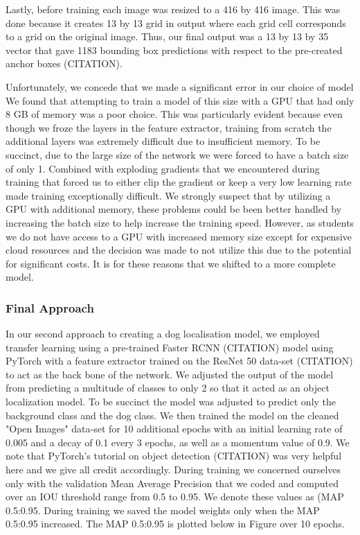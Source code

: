 \documentclass{article}
\begin{document}
\newpage \noindent Lastly, before training each image was resized to a 416 by 416 image.  This was done because it creates 13 by 13 grid in output where each grid cell corresponds to a grid on the original image.  Thus, our final output was a 13 by 13 by 35 vector that gave 1183 bounding box predictions with respect to the pre-created anchor boxes (CITATION).

Unfortunately, we concede that we made a significant error in our choice of model  We found that attempting to train a model of this size with a GPU that had only 8 GB of memory was a poor choice.  This was particularly evident because even though we froze the layers in the feature extractor, training from scratch the additional layers was extremely difficult due to insufficient memory.  To be succinct, due to the large size of the network we were forced to have a batch size of only 1.  Combined with exploding gradients that we encountered during training that forced us to either clip the gradient or keep a very low learning rate made training exceptionally difficult.   We strongly suspect that by utilizing a GPU with additional memory, these problems could be been better handled by increasing the batch size to help increase the training speed.  However, as students we do not have access to a GPU with increased memory size except for expensive cloud resources and the decision was made to not utilize this due to the potential for significant costs.  It is for these reasons that we shifted to a more complete model.

\subsubsection{Final Approach}

In our second approach to creating a dog localisation model, we employed transfer learning using a pre-trained Faster RCNN (CITATION) model using PyTorch with a feature extractor trained on the ResNet 50 data-set (CITATION) to act as the back bone of the network.  We adjusted the output of the model from predicting a multitude of classes to only 2 so that it acted as an object localization model.  To be succinct the model was adjusted to predict only the background class and the dog class.  We then trained the model on the cleaned "Open Images" data-set for 10 additional epochs with an initial learning rate of 0.005 and a decay of 0.1 every 3 epochs, as well as a momentum value of 0.9.  We note that PyTorch's tutorial on object detection (CITATION) was very helpful here and we give all credit accordingly.  During training we concerned ourselves only with the validation Mean Average Precision that we coded and computed over an IOU threshold range from 0.5 to 0.95.  We denote these values as (MAP 0.5:0.95.  During training we saved the model weights only when the MAP 0.5:0.95 increased.  The MAP 0.5:0.95 is plotted below in Figure over 10 epochs.
\end{document}
